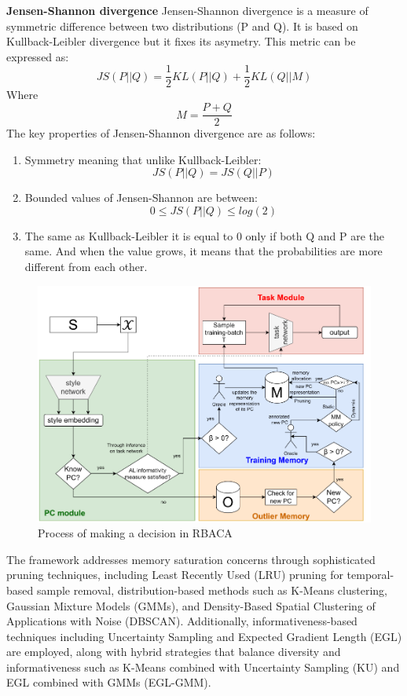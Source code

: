 \documentclass{IEEEcsmag}
\begin{document}
    \textbf{Jensen-Shannon divergence}
        Jensen-Shannon divergence is a measure of symmetric difference between two distributions (P and Q).
        It is based on Kullback-Leibler divergence but it fixes its asymetry.
        This metric can be expressed as:
        \[
            JS(P||Q) = \frac{1}{2}KL(P||Q) + \frac{1}{2}KL(Q||M)
        \]
        Where
        \[
            M = \frac{P+Q}{2}
        \]
        The key properties of Jensen-Shannon  divergence are as follows:
        \begin{enumerate}
            \item Symmetry meaning that unlike Kullback-Leibler:
             \[
                JS(P||Q) = JS(Q||P)
            \]
            \item Bounded values of Jensen-Shannon are between: 
            \[
                0 \leq JS(P||Q) \leq log(2)
            \]
            \item The same as Kullback-Leibler it is equal to 0 only if both Q and P are the same. And when the value grows, it means that the probabilities are more different from each other.
        \end{enumerate}

    \begin{figure}
        \centering
        \includegraphics[width=\linewidth]{images/Cite-19-img-1.png}
        \caption{Process of making a decision in RBACA}
        \label{fig:Cite-19-img-1}
    \end{figure}
    
    The framework addresses memory saturation concerns through sophisticated pruning techniques, including Least Recently Used (LRU) pruning for temporal-based sample removal, distribution-based methods such as K-Means clustering, Gaussian Mixture Models (GMMs), and Density-Based Spatial Clustering of Applications with Noise (DBSCAN)\cite{cite-19}.
    Additionally, informativeness-based techniques including Uncertainty Sampling and Expected Gradient Length (EGL) are employed, along with hybrid strategies that balance diversity and informativeness such as K-Means combined with Uncertainty Sampling (KU) and EGL combined with GMMs (EGL-GMM)\cite{cite-19}.
    
\end{document}
